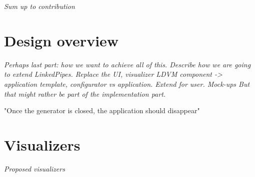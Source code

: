 \textit{Sum up to contribution}

\section{Design overview}

\textit{Perhaps last part: how we want to achieve all of this. Describe how we are going to extend LinkedPipes. Replace the UI, visualizer LDVM component -> application template, configurator vs application. Extend for user. Mock-ups But that might rather be part of the implementation part.}	


"Once the generator is closed, the application should disappear"

\section{Visualizers}

\textit{Proposed visualizers}


	